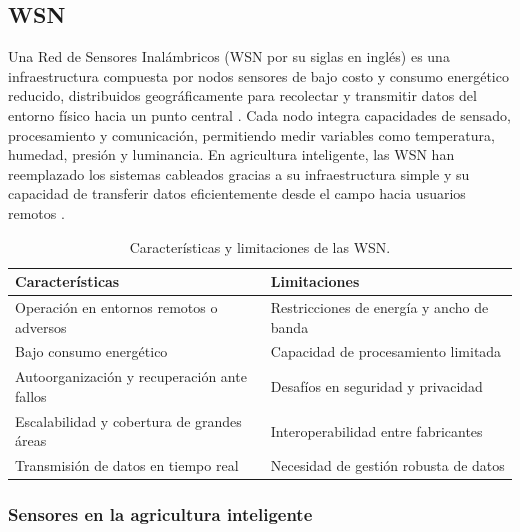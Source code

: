 \subsection{WSN}

Una Red de Sensores Inalámbricos (WSN por su siglas en inglés) es una infraestructura compuesta por nodos sensores de
bajo costo y consumo energético reducido, distribuidos
geográficamente para recolectar y transmitir datos del entorno
físico hacia un punto central \parencite{rani2024wsn_iot}. Cada
nodo integra capacidades de sensado, procesamiento y comunicación,
permitiendo medir variables como temperatura, humedad, presión y
luminancia. En agricultura inteligente, las WSN han reemplazado
los sistemas cableados gracias a su infraestructura simple y su
capacidad de transferir datos eficientemente desde el campo hacia
usuarios remotos \parencite{alahmad2023applying}.

\begin{table}[H]
      \centering
      \begin{tabularx}{0.85\textwidth}{>{\raggedright\arraybackslash}X
                  >{\raggedright\arraybackslash}X}
            \toprule
            \textbf{Características} & \textbf{Limitaciones}                     \\
            \midrule
            Operación en entornos remotos o adversos
                                     & Restricciones de energía y ancho de banda \\
            Bajo consumo energético
                                     & Capacidad de procesamiento limitada       \\
            Autoorganización y recuperación ante fallos
                                     & Desafíos en seguridad y privacidad        \\
            Escalabilidad y cobertura de grandes áreas
                                     & Interoperabilidad entre fabricantes       \\
            Transmisión de datos en tiempo real
                                     & Necesidad de gestión robusta de datos     \\
            \bottomrule
      \end{tabularx}
      \caption{Características y limitaciones de las WSN.
            \parencite{rani2024wsn_iot, alahmad2023applying}}
      \label{tab:wsn_caract}
\end{table}


\subsubsection{Sensores en la agricultura inteligente}

